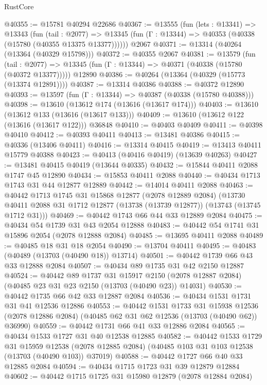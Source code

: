 \begin{lexlean}{RustCore}
\begin{coremodule}
@40355 := @15781 @40294 @22686
@40367 := @13555
    (fun (lets : @13341) =>
    @13343
      (fun (tail : @2077) =>
      @13345 (fun (Γ : @13344) => @40353 (@40338 (@15780 (@40355 @13375 @13377))))))
    @2067
@40371 := @13314 (@40264 (@13364 (@40329 @15798)))
@40372 := @40355 @2067
@40381 := @13579
    (fun (tail : @2077) => @13345 (fun (Γ : @13344) => @40371 (@40338 (@15780 (@40372 @13377)))))
    @12890
@40386 := @40264 (@13364 (@40329 (@15773 (@13374 @12891))))
@40387 := @13314 @40386
@40388 := @40372 @12890
@40393 := @13597 (fun (Γ : @13344) => @40387 (@40338 (@15780 @40388)))
@40398 := @13610 (@13612 @174 (@13616 (@13617 @174)))
@40403 := @13610 (@13612 @133 (@13616 (@13617 @133)))
@40409 := @13610 (@13612 @122 (@13616 (@13617 @122))) @36848
@40410 := @40403 @40409
@40411 := @40398 @40410
@40412 := @40393 @40411
@40413 := @13481 @40386
@40415 := @40336 (@13406 @40411)
@40416 := @13314 @40415
@40419 := @13413 @40411 @15779 @40388
@40423 := @40413 (@40416 @40419) (@13639 @40263)
@40427 := @13481 @40415 @40419 (@13644 @40335)
@40432 := @15844 @40411 @2088 @1747 @45 @12890
@40434 := @15853 @40411 @2088
@40440 := @40434 @1713 @1743 @31 @44 @12877 @12889
@40442 := @14014 @40411 @2088
@40463 := @40442
    @1713
    @1745
    @31
    @15868
    @12877
    (@2078 @12889 @2084)
    (@13730 @40411 @2088 @31 @1712 @12877 (@13738 (@13739 @12877)) (@13743 (@13745 @1712 @31)))
@40469 := @40442 @1743 @66 @44 @33 @12889 @2084
@40475 := @40434 @54 @1739 @31 @43 @2054 @12888
@40483 := @40442 @54 @1741 @31 @15896 @2054 (@2078 @12888 @2084)
@40485 := @13695 @40411 @2088
@40489 := @40485 @18 @31 @18 @2054
@40490 := @13704 @40411
@40495 := @40483 (@40489 (@13703 (@40490 @18)) @13714)
@40501 := @40442 @1739 @66 @43 @33 @12888 @2084
@40507 := @40434 @89 @1735 @31 @42 @2150 @12887
@40524 := @40442
    @89
    @1737
    @31
    @15917
    @2150
    (@2078 @12887 @2084)
    (@40485 @23 @31 @23 @2150 (@13703 (@40490 @23)) @14031)
@40530 := @40442 @1735 @66 @42 @33 @12887 @2084
@40536 := @40434 @1531 @1731 @31 @41 @12536 @12886
@40553 := @40442
    @1531
    @1733
    @31
    @15938
    @12536
    (@2078 @12886 @2084)
    (@40485 @62 @31 @62 @12536 (@13703 (@40490 @62)) @36990)
@40559 := @40442 @1731 @66 @41 @33 @12886 @2084
@40565 := @40434 @1533 @1727 @31 @40 @12538 @12885
@40582 := @40442
    @1533
    @1729
    @31
    @15959
    @12538
    (@2078 @12885 @2084)
    (@40485 @103 @31 @103 @12538 (@13703 (@40490 @103)) @37019)
@40588 := @40442 @1727 @66 @40 @33 @12885 @2084
@40594 := @40434 @1715 @1723 @31 @39 @12879 @12884
@40602 := @40442 @1715 @1725 @31 @15980 @12879 (@2078 @12884 @2084)

\end{coremodule}
\end{lexlean}

